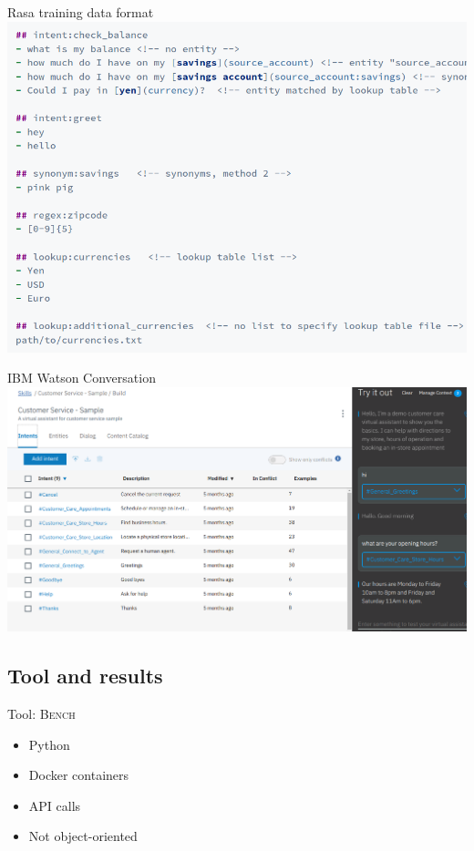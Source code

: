 \documentclass[pdf]{beamer}
\begin{document}
    \begin{frame}{Rasa training data format}
        \includegraphics[width=\textwidth]{figures/rasa_data_format.png}
    \end{frame}

    \begin{frame}{IBM Watson Conversation}
        \hspace*{-1cm}
        \includegraphics[height=0.9\textheight]{figures/watson.png}
    \end{frame}

    \subsection{Tool and results}
    \begin{frame}{Tool: \textsc{Bench}}
        \begin{itemize}
            \item Python
            \item Docker containers
            \item API calls
            \item Not object-oriented\footnotemark
        \end{itemize}
      \end{frame}
      
\end{document}

